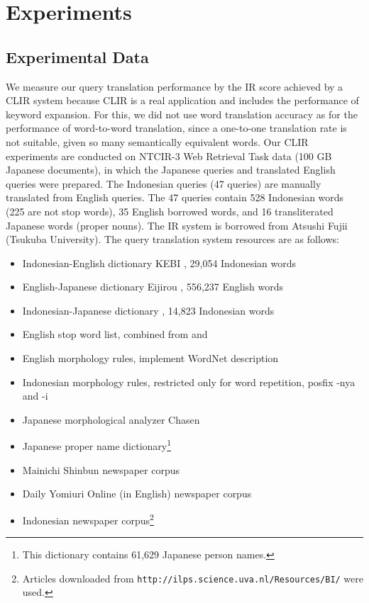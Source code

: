 \documentclass[english]{jnlp_1.3c}
\begin{document}
\section{Experiments}

\subsection{Experimental Data}
\label{Experimental Data} We measure our query translation performance
by the IR score achieved by a CLIR system because CLIR is a real
application and includes the performance of keyword expansion. For
this, we did not use word translation accuracy as for the performance of
word-to-word translation, since a one-to-one translation rate is not
suitable, given so many semantically equivalent words.  Our CLIR
experiments are conducted on NTCIR-3 Web Retrieval Task data (100 GB
Japanese documents), in which the Japanese queries and translated
English queries were prepared. The Indonesian queries (47 queries) are
manually translated from English queries. The 47 queries contain 528
Indonesian words (225 are not stop words), 35 English borrowed words,
and 16 transliterated Japanese words (proper nouns). The IR system
\cite{fujii2003} is borrowed from Atsushi Fujii (Tsukuba
University). The query translation system resources are as follows:

\begin{itemize}
 \item Indonesian-English dictionary KEBI \cite{kebi}, 29,054 Indonesian words
 \item English-Japanese dictionary Eijirou \cite{eijiro}, 556,237 English words
 \item Indonesian-Japanese dictionary \cite{kamusjpina}, 14,823 Indonesian words
 \item English stop word list, combined from \cite{fox1990} and \cite{zu2004}
 \item English morphology rules, implement WordNet \cite{wordnet} description
 \item Indonesian morphology rules, restricted only for word repetition, posfix
 -nya and -i
 \item Japanese morphological analyzer Chasen \cite{chasen}
 \item Japanese proper name dictionary\footnote{This dictionary contains 61,629 Japanese person names.}
 \item Mainichi Shinbun newspaper corpus \cite{mainichi}
 \item Daily Yomiuri Online (in English) newspaper corpus \cite{yomiuri}
 \item Indonesian newspaper corpus\footnote{
	Articles downloaded from \texttt{http://ilps.science.uva.nl/Resources/BI/} were used.}
\end{itemize}
\end{document}
